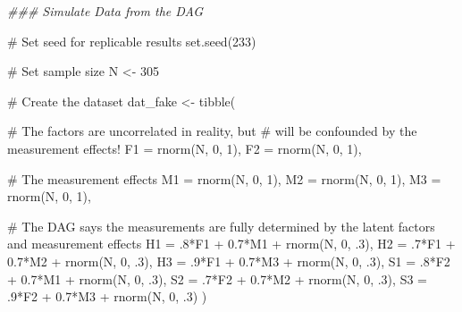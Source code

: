 \documentclass[
  letterpaper,
  DIV=11,
  numbers=noendperiod]{scrreprt}
\newenvironment{Shaded}{\begin{snugshade}}{\end{snugshade}}
\newcommand{\AttributeTok}[1]{\textcolor[rgb]{0.40,0.45,0.13}{#1}}
\newcommand{\CommentTok}[1]{\textcolor[rgb]{0.37,0.37,0.37}{#1}}
\newcommand{\DecValTok}[1]{\textcolor[rgb]{0.68,0.00,0.00}{#1}}
\newcommand{\DocumentationTok}[1]{\textcolor[rgb]{0.37,0.37,0.37}{\textit{#1}}}
\newcommand{\FloatTok}[1]{\textcolor[rgb]{0.68,0.00,0.00}{#1}}
\newcommand{\FunctionTok}[1]{\textcolor[rgb]{0.28,0.35,0.67}{#1}}
\newcommand{\NormalTok}[1]{\textcolor[rgb]{0.00,0.23,0.31}{#1}}
\newcommand{\OtherTok}[1]{\textcolor[rgb]{0.00,0.23,0.31}{#1}}
\newcommand{\SpecialCharTok}[1]{\textcolor[rgb]{0.37,0.37,0.37}{#1}}
\begin{document}
\begin{Shaded}
\begin{Highlighting}[]
\DocumentationTok{\#\#\# Simulate Data from the DAG}

\CommentTok{\# Set seed for replicable results}
\FunctionTok{set.seed}\NormalTok{(}\DecValTok{233}\NormalTok{)}

\CommentTok{\# Set sample size}
\NormalTok{N }\OtherTok{\textless{}{-}} \DecValTok{305}

\CommentTok{\# Create the dataset}
\NormalTok{dat\_fake }\OtherTok{\textless{}{-}} \FunctionTok{tibble}\NormalTok{(}
  
  \CommentTok{\# The factors are uncorrelated in reality, but}
  \CommentTok{\# will be confounded by the measurement effects!}
  \AttributeTok{F1 =} \FunctionTok{rnorm}\NormalTok{(N, }\DecValTok{0}\NormalTok{, }\DecValTok{1}\NormalTok{),}
  \AttributeTok{F2 =} \FunctionTok{rnorm}\NormalTok{(N, }\DecValTok{0}\NormalTok{, }\DecValTok{1}\NormalTok{),}
  
  \CommentTok{\# The measurement effects}
  \AttributeTok{M1 =} \FunctionTok{rnorm}\NormalTok{(N, }\DecValTok{0}\NormalTok{, }\DecValTok{1}\NormalTok{),}
  \AttributeTok{M2 =} \FunctionTok{rnorm}\NormalTok{(N, }\DecValTok{0}\NormalTok{, }\DecValTok{1}\NormalTok{),}
  \AttributeTok{M3 =} \FunctionTok{rnorm}\NormalTok{(N, }\DecValTok{0}\NormalTok{, }\DecValTok{1}\NormalTok{),}
  
  \CommentTok{\# The DAG says the measurements are fully determined by the latent factors and measurement effects}
  \AttributeTok{H1 =}\NormalTok{ .}\DecValTok{8}\SpecialCharTok{*}\NormalTok{F1 }\SpecialCharTok{+} \FloatTok{0.7}\SpecialCharTok{*}\NormalTok{M1 }\SpecialCharTok{+} \FunctionTok{rnorm}\NormalTok{(N, }\DecValTok{0}\NormalTok{, .}\DecValTok{3}\NormalTok{),}
  \AttributeTok{H2 =}\NormalTok{ .}\DecValTok{7}\SpecialCharTok{*}\NormalTok{F1 }\SpecialCharTok{+} \FloatTok{0.7}\SpecialCharTok{*}\NormalTok{M2 }\SpecialCharTok{+} \FunctionTok{rnorm}\NormalTok{(N, }\DecValTok{0}\NormalTok{, .}\DecValTok{3}\NormalTok{),}
  \AttributeTok{H3 =}\NormalTok{ .}\DecValTok{9}\SpecialCharTok{*}\NormalTok{F1 }\SpecialCharTok{+} \FloatTok{0.7}\SpecialCharTok{*}\NormalTok{M3 }\SpecialCharTok{+} \FunctionTok{rnorm}\NormalTok{(N, }\DecValTok{0}\NormalTok{, .}\DecValTok{3}\NormalTok{),}
  \AttributeTok{S1 =}\NormalTok{ .}\DecValTok{8}\SpecialCharTok{*}\NormalTok{F2 }\SpecialCharTok{+} \FloatTok{0.7}\SpecialCharTok{*}\NormalTok{M1 }\SpecialCharTok{+} \FunctionTok{rnorm}\NormalTok{(N, }\DecValTok{0}\NormalTok{, .}\DecValTok{3}\NormalTok{),}
  \AttributeTok{S2 =}\NormalTok{ .}\DecValTok{7}\SpecialCharTok{*}\NormalTok{F2 }\SpecialCharTok{+} \FloatTok{0.7}\SpecialCharTok{*}\NormalTok{M2 }\SpecialCharTok{+} \FunctionTok{rnorm}\NormalTok{(N, }\DecValTok{0}\NormalTok{, .}\DecValTok{3}\NormalTok{),}
  \AttributeTok{S3 =}\NormalTok{ .}\DecValTok{9}\SpecialCharTok{*}\NormalTok{F2 }\SpecialCharTok{+} \FloatTok{0.7}\SpecialCharTok{*}\NormalTok{M3 }\SpecialCharTok{+} \FunctionTok{rnorm}\NormalTok{(N, }\DecValTok{0}\NormalTok{, .}\DecValTok{3}\NormalTok{) }
\NormalTok{) }
\end{Highlighting}
\end{Shaded}
\end{document}
